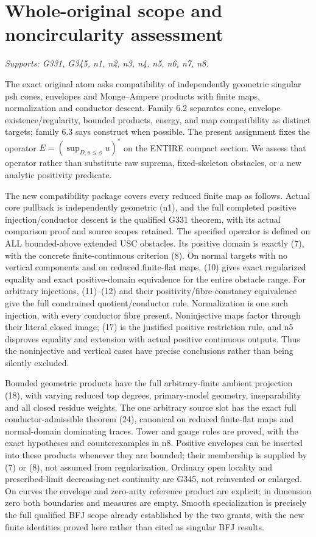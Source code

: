 \documentclass[11pt]{article}
\begin{document}
\section{Whole-original scope and noncircularity assessment}
\textit{Supports: G331, G345, n1, n2, n3, n4, n5, n6, n7, n8.}

The exact original atom asks compatibility of independently geometric singular psh cones, envelopes and Monge--Ampere products with finite maps, normalization and conductor descent. Family 6.2 separates cone, envelope existence/regularity, bounded products, energy, and map compatibility as distinct targets; family 6.3 says construct when possible. The present assignment fixes the operator $E=(\sup_{D,u\le\phi}u)^*$ on the ENTIRE compact section. We assess that operator rather than substitute raw suprema, fixed-skeleton obstacles, or a new analytic positivity predicate.

The new compatibility package covers every reduced finite map as follows. Actual core pullback is independently geometric (n1), and the full completed positive injection/conductor descent is the qualified G331 theorem, with its actual comparison proof and source scopes retained. The specified operator is defined on ALL bounded-above extended USC obstacles. Its positive domain is exactly (7), with the concrete finite-continuous criterion (8). On normal targets with no vertical components and on reduced finite-flat maps, (10) gives exact regularized equality and exact positive-domain equivalence for the entire obstacle range. For arbitrary injections, (11)--(12) and their positivity/fibre-constancy equivalence give the full constrained quotient/conductor rule. Normalization is one such injection, with every conductor fibre present. Noninjective maps factor through their literal closed image; (17) is the justified positive restriction rule, and n5 disproves equality and extension with actual positive continuous outputs. Thus the noninjective and vertical cases have precise conclusions rather than being silently excluded.

Bounded geometric products have the full arbitrary-finite ambient projection (18), with varying reduced top degrees, primary-model geometry, inseparability and all closed residue weights. The one arbitrary source slot has the exact full conductor-admissible theorem (24), canonical on reduced finite-flat maps and normal-domain dominating traces. Tower and gauge rules are proved, with the exact hypotheses and counterexamples in n8. Positive envelopes can be inserted into these products whenever they are bounded; their membership is supplied by (7) or (8), not assumed from regularization. Ordinary open locality and prescribed-limit decreasing-net continuity are G345, not reinvented or enlarged. On curves the envelope and zero-arity reference product are explicit; in dimension zero both boundaries and measures are empty. Smooth specialization is precisely the full qualified BFJ scope already established by the two grants, with the new finite identities proved here rather than cited as singular BFJ results.
\end{document}
